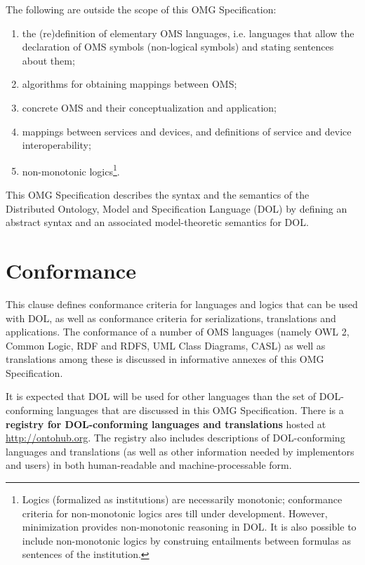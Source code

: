 \documentclass[10pt,fleqn,%
\ifpretendfinal
final%
\else
draft%
\fi,
]{scrreprt}
\makeatletter
\newcommand*{\ie}{i.e.\@\xspace}
\newcommand*\CommentAuthor{}
\renewcommand*\CommentAuthor{#1}}
\newcommand*\CommentDate{}
\renewcommand*\CommentDate{#1}}
\newcommand*\CommentId{}
\renewcommand*\CommentId{#1}}
\newcommand*\CommentType{}
\renewcommand*\CommentType{#1}}
\newcommand*{\SetCommentColorByType}[1]{%
\edef\localType{{#1}}%
\expandafter\ifstrequal\localType{q-aut}{\colorlet{CommentColor}{red}}{%
\expandafter\ifstrequal\localType{q-all}{\colorlet{CommentColor}{orange}}{%
\expandafter\ifstrequal\localType{todo}{\colorlet{CommentColor}{orange}}{%
\expandafter\ifstrequal\localType{fyi}{\colorlet{CommentColor}{lightgray}}{%
\colorlet{CommentColor}{yellow}}}}}}
\newcommand*{\SetCommentPrefixByType}[1]{%
\edef\localType{{#1}}%
\expandafter\@ifmtarg\localType{%
\edef\CommentPrefix{}%
}{%
\caseupper[q]{#1}%
\edef\CommentPrefix{\thestring: }%
}}
\newcommand*{\initComment}[1]{%
\setkeys{Comment}{#1}%
\SetCommentColorByType{\CommentType}%
\relax%
\SetCommentPrefixByType{\CommentType}%
\relax%
}
\newcommand*{\todonote}[2][]{%
\initComment{#1}%
\pdfcomment[author=\CommentAuthor,color=CommentColor,date=\CommentDate,id=\CommentId]{%
\CommentPrefix
#2}}
\renewcommand*{\todonote}[2][]{%
\initComment{#1}%
\ednote{\CommentPrefix #2}}
\newcommand*{\termref}[1]{\index{#1}#1\xspace}
\newcommand*{\IS}{OMG Specification\xspace}
\makeatother
\begin{document}
The following are outside the scope of this \IS:
\begin{enumerate}
\item the (re)definition of elementary OMS languages, \ie languages that allow the declaration of OMS symbols (non-logical symbols) 
and
stating sentences about them;
\item algorithms for obtaining mappings between OMS;
\item concrete OMS and their conceptualization and application;
\item mappings between services and devices, and definitions of service and device interoperability;
\item non-monotonic logics\footnote{Logics (formalized as institutions) are necessarily monotonic; conformance criteria for non-monotonic logics ares till under development. However, minimization provides non-monotonic reasoning in DOL. It is also possible to include non-monotonic logics by construing entailments between formulas as sentences of the institution.}. 

\end{enumerate}

This \IS describes the syntax and the semantics of the Distributed Ontology, Model and
Specification Language (DOL) by defining an abstract syntax and an associated model-theoretic
semantics for DOL. 


\chapter{Conformance}\label{c:conformance}
This clause defines conformance criteria for languages and logics that can be used with DOL, as well as conformance criteria for
serializations, translations and applications. The conformance of a
number of OMS languages (namely OWL 2, Common Logic, RDF and RDFS, UML Class Diagrams, CASL) as well as translations among
these is discussed in informative annexes of this \IS.

It is expected that DOL will be used for other languages than the  set of DOL-conforming
languages that are discussed in this \IS. There is a  \textbf{\termref{registry} for DOL-conforming languages and translations} hosted
at \url{http://ontohub.org}.  The registry  also includes descriptions of
DOL-conforming languages and translations (as well as other information needed by implementors
and users) in both human-readable and machine-processable form.  
\end{document}
